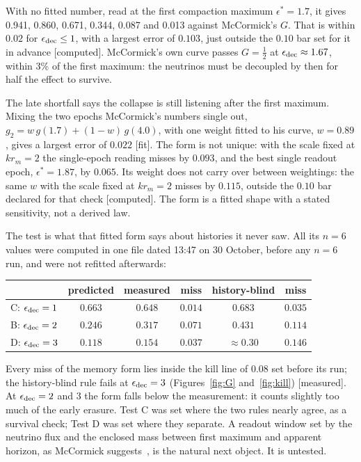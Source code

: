 \documentclass[11pt]{article}
\newcommand{\grade}[1]{\textsf{\small[#1]}}
\begin{document}
With no fitted number, read at the first compaction maximum $\epsilon^\ast=1.7$, it gives 0.941, 0.860, 0.671, 0.344, 0.087 and 0.013 against McCormick's $G$. That is within $0.02$ for $\epsilon_{\rm dec}\le1$, with a largest error of $0.103$, just outside the $0.10$ bar set for it in advance \grade{computed}. McCormick's own curve passes $G=\tfrac12$ at $\epsilon_{\rm dec}\approx1.67$, within 3\% of the first maximum: the neutrinos must be decoupled by then for half the effect to survive.

The late shortfall says the collapse is still listening after the first maximum. Mixing the two epochs McCormick's numbers single out, $g_2=w\,g(1.7)+(1-w)\,g(4.0)$, with one weight fitted to his curve, $w=0.89$, gives a largest error of $0.022$ \grade{fit}. The form is not unique: with the scale fixed at $kr_m=2$ the single-epoch reading misses by $0.093$, and the best single readout epoch, $\epsilon^\ast=1.87$, by $0.065$. Its weight does not carry over between weightings: the same $w$ with the scale fixed at $kr_m=2$ misses by $0.115$, outside the $0.10$ bar declared for that check \grade{computed}. The form is a fitted shape with a stated sensitivity, not a derived law.

The test is what that fitted form says about histories it never saw. All its $n=6$ values were computed in one file dated 13:47 on 30 October, before any $n=6$ run, and were not refitted afterwards:
\begin{center}\begin{tabular}{lccccc}\toprule
& predicted & measured & miss & history-blind & miss\\\midrule
C: $\epsilon_{\rm dec}=1$ & $0.663$ & $0.648$ & $0.014$ & $0.683$ & $0.035$\\
B: $\epsilon_{\rm dec}=2$ & $0.246$ & $0.317$ & $0.071$ & $0.431$ & $0.114$\\
D: $\epsilon_{\rm dec}=3$ & $0.118$ & $0.154$ & $0.037$ & $\approx0.30$ & $0.146$\\\bottomrule\end{tabular}\end{center}
Every miss of the memory form lies inside the kill line of $0.08$ set before its run; the history-blind rule fails at $\epsilon_{\rm dec}=3$ (Figures~\ref{fig:G} and~\ref{fig:kill}) \grade{measured}. At $\epsilon_{\rm dec}=2$ and 3 the form falls below the measurement: it counts slightly too much of the early erasure. Test C was set where the two rules nearly agree, as a survival check; Test D was set where they separate. A readout window set by the neutrino flux and the enclosed mass between first maximum and apparent horizon, as McCormick suggests~\cite[Sec.~IV\,C]{McC}, is the natural next object. It is untested.
\end{document}
